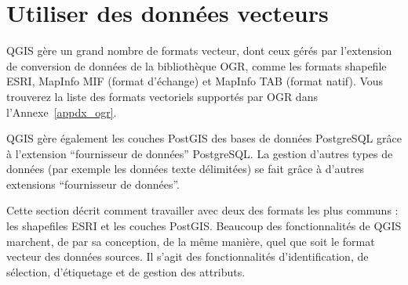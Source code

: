 
\section{Utiliser des données vecteurs}\label{label_workingvector}



QGIS gère un grand nombre de formats vecteur, dont ceux gérés par l'extension de conversion de données de la bibliothèque OGR, comme les formats shapefile ESRI, MapInfo MIF (format d'échange) et  MapInfo TAB (format natif).
Vous trouverez la liste des formats vectoriels supportés par OGR dans l'Annexe~\ref{appdx_ogr}.

QGIS gère également les couches PostGIS des bases de données PostgreSQL grâce à l'extension ``fournisseur de données'' PostgreSQL. La gestion d'autres types de données (par exemple les données texte délimitées) se fait grâce à d'autres extensions ``fournisseur de données''.

Cette section décrit comment travailler avec deux des formats les plus communs : les shapefiles ESRI et les couches PostGIS. Beaucoup des fonctionnalités de QGIS marchent, de par sa conception, de la même manière, quel que soit le format vecteur des données sources. Il s'agit des fonctionnalités d'identification, de sélection, d'étiquetage et de gestion des attributs.


